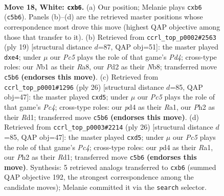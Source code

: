 \documentclass[11pt]{article}
\begin{document}
\clearpage

\begin{figure}[p]\centering
\begin{subfigure}{0.46\textwidth}\centering
\resizebox{\linewidth}{!}{%
\newchessgame
\chessboard[
  setfen={rbbqr1k1/pp3ppp/1n2p3/2P1n3/3p2P1/1P4KB/P2P1P1P/RNBQR3 w - - 1 18},
  showmover=false,
  pgfstyle=straightmove, color=movearrow, markmove={c5-b6}
]}
\caption{}
\end{subfigure}\hfill
\begin{subfigure}{0.46\textwidth}\centering
\resizebox{\linewidth}{!}{%
\newchessgame
\chessboard[
  setfen={rn1q1rk1/pp2ppbp/6p1/3pNb2/3PN3/6P1/PP2PPBP/R1BQ1RK1 b - - 0 10},
  showmover=false,
  pgfstyle=straightmove, color=movearrow, markmove={d5-e4}
]}
\caption{}
\end{subfigure}
\\[4pt]
\begin{subfigure}{0.46\textwidth}\centering
\resizebox{\linewidth}{!}{%
\newchessgame
\chessboard[
  setfen={r1b1r1k1/1pp1qpbp/p2p2p1/3nn3/2PNPB2/6P1/PPQ2PBP/R2R2K1 w - - 0 14},
  showmover=false,
  pgfstyle=straightmove, color=movearrow, markmove={c4-d5}
]}
\caption{}
\end{subfigure}\hfill
\begin{subfigure}{0.46\textwidth}\centering
\resizebox{\linewidth}{!}{%
\newchessgame
\chessboard[
  setfen={r1b1r1k1/1pp1qpbp/p2p2p1/3nn3/2PNPB2/6P1/PPQ2PBP/R2R2K1 w - - 0 14},
  showmover=false,
  pgfstyle=straightmove, color=movearrow, markmove={c4-d5}
]}
\caption{}
\end{subfigure}
\caption{\textbf{Move 18, White: \texttt{cxb6}.} (a) Our position; Melanie plays \texttt{cxb6} (\texttt{c5b6}). Panels (b)--(d) are the retrieved master positions whose correspondence most drove this move (highest QAP objective among those that transfer to it). (b) Retrieved from \texttt{ccrl\_top\_p0002\#2563} (ply 19) [structural distance $d$=87, QAP obj=51]: the master played \texttt{dxe4}; under $\mu$ our \emph{Pc5} plays the role of that game's \emph{Pd4}; cross-type roles: our \emph{N}b1 as their \emph{R}a8, our \emph{P}d2 as their \emph{N}b8; transferred move \texttt{c5b6} \textbf{(endorses this move)}. (c) Retrieved from \texttt{ccrl\_top\_p0001\#1296} (ply 26) [structural distance $d$=85, QAP obj=47]: the master played \texttt{cxd5}; under $\mu$ our \emph{Pc5} plays the role of that game's \emph{Pc4}; cross-type roles: our \emph{p}d4 as their \emph{R}a1, our \emph{P}h2 as their \emph{R}d1; transferred move \texttt{c5b6} \textbf{(endorses this move)}. (d) Retrieved from \texttt{ccrl\_top\_p0003\#2214} (ply 26) [structural distance $d$=85, QAP obj=47]: the master played \texttt{cxd5}; under $\mu$ our \emph{Pc5} plays the role of that game's \emph{Pc4}; cross-type roles: our \emph{p}d4 as their \emph{R}a1, our \emph{P}h2 as their \emph{R}d1; transferred move \texttt{c5b6} \textbf{(endorses this move)}. Synthesis: 5 retrieved analogs transferred to \texttt{cxb6} (summed QAP objective 192, the strongest correspondence among the candidate moves); Melanie committed it via the \texttt{search} selector.}
\label{fig:thought-m34}
\end{figure}
\end{document}
